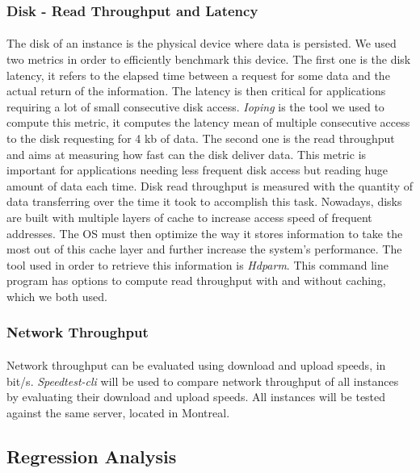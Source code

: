 \documentclass[11pt]{article}
\begin{document}
		\subsubsection{Disk - Read Throughput and Latency}
			\paragraph{} The disk of an instance is the physical device where data
			is persisted. We used two metrics in order to efficiently benchmark this
			device. The first one is the disk latency, it refers to the elapsed time
			between a request for some data and the actual return of the
			information. The latency is then critical for applications requiring a
			lot of small consecutive disk access. \emph{Ioping} is the tool we used to
			compute this metric, it computes the latency mean of multiple
			consecutive access to the disk requesting for 4 kb of data. The second
			one is the read throughput and aims at measuring how fast can the disk
			deliver data. This metric is important for applications needing less
			frequent disk access but reading huge amount of data each time. Disk
			read throughput is measured with the quantity of data transferring over
			the time it took to accomplish this task. Nowadays, disks are built with
			multiple layers of cache to increase access speed of frequent addresses.
			The OS must then optimize the way it stores information to take the most
			out of this cache layer and further increase the system’s performance.
			The tool used in order to retrieve this information is \emph{Hdparm}.  This
			command line program has options to compute read throughput with and
			without caching, which we both used. 
		\subsubsection{Network Throughput}
			\paragraph{} Network throughput can be evaluated using download and
			upload speeds, in bit/s. \emph{Speedtest-cli} will be used to compare network
			throughput of all instances by evaluating their download and upload
			speeds. All instances will be tested against the same server, located in
			Montreal. \cite{6}
	\subsection{Regression Analysis}
\end{document}
